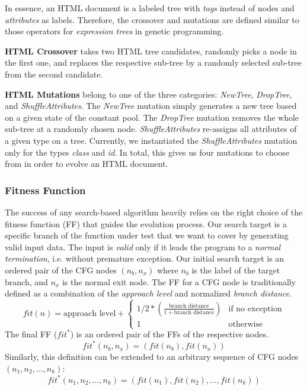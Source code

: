 \documentclass[sigconf,review]{acmart}
\begin{document}
In essence, an HTML document is a labeled tree with \emph{tags} instead of nodes and \emph{attributes} as labels. Therefore, the crossover and mutations are defined similar to those operators for \emph{expression trees} in genetic programming.  

\textbf{HTML Crossover} takes two HTML tree candidates, randomly picks a node in the first one, and replaces the respective sub-tree by a randomly selected sub-tree from the second candidate.

\textbf{HTML Mutations} belong to one of the three categories: \emph{NewTree}, \emph{DropTree}, and \emph{ShuffleAttributes}. The \emph{NewTree} mutation simply generates a new tree based on a given state of the constant pool. The \emph{DropTree} mutation removes the whole sub-tree at a randomly chosen node. \emph{ShuffleAttributes} re-assigns all attributes of a given type on a tree. Currently, we instantiated the \emph{ShuffleAttributes} mutation only for the types \emph{class} and \emph{id}. In total, this gives us four mutations to choose from in order to evolve an HTML document.

\subsubsection{Fitness Function}
\label{sub.sub.sec.fitness.fun}

The success of any search-based algorithm heavily relies on the right choice of the fitness function (FF) that guides the evolution process. Our search target is a specific branch of the function under test that we want to cover by generating valid input data. The input is \emph{valid} only if it leads the program to a \emph{normal termination}, i.e. without premature exception. Our initial search target is an ordered pair of the CFG nodes $(n_b, n_x)$ where $n_b$ is the label of the target branch, and $n_x$ is the normal exit node. The FF for a CFG node is traditionally defined as a combination of the \emph{approach level} and normalized \emph{branch distance}\cite{arcuri2010does}. 
\[
\textit{fit}(n) = \text{approach level} +
\begin{cases}
 1/2 * (\frac{\text{branch distance}}{1 + \text{branch distance}}) & \text{if no exception}\\
 1                                  &  \text{otherwise}
\end{cases}
\]
The final FF ($\textit{fit}^*$) is an ordered pair of the FFs of the respective nodes.   
\[
\textit{fit}^*(n_b, n_x) = (\textit{fit}(n_b), \textit{fit}(n_x))
\]
Similarly, this definition can be extended to an arbitrary sequence of CFG nodes $(n_1, n_2, \ldots, n_k)$:
 \[
\textit{fit}^*(n_1, n_2, \ldots, n_k) = (\textit{fit}(n_1), \textit{fit}(n_2), \ldots, \textit{fit}(n_k))
\]
\end{document}
